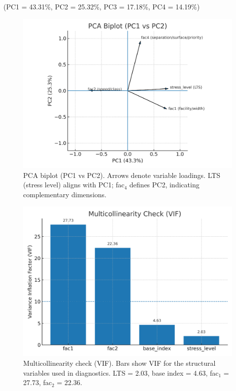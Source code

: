 \documentclass[
  12pt,
  oneside]{book}
\begin{document}
(PC1 = 43.31\%, PC2 = 25.32\%, PC3 = 17.18\%, PC4 = 14.19\%)

\begin{figure}

{\centering \includegraphics[width=0.9\linewidth]{general_images/pca} 

}

\caption{PCA biplot (PC1 vs PC2). Arrows denote variable loadings. LTS (stress level) aligns with PC1; fac$_4$ defines PC2, indicating complementary dimensions.}\label{fig:pca}
\end{figure}

\begin{figure}

{\centering \includegraphics[width=0.75\linewidth]{general_images/vif1} 

}

\caption{Multicollinearity check (VIF). Bars show VIF for the structural variables used in diagnostics. LTS = 2.03, base index = 4.63, fac$_1$ = 27.73, fac$_2$ = 22.36.}\label{fig:vif1}
\end{figure}
\end{document}
